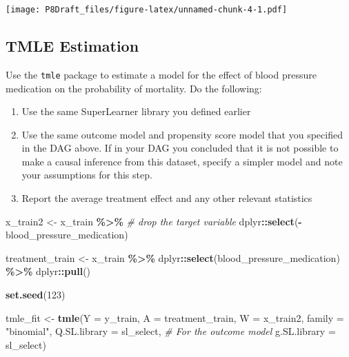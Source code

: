 \documentclass[
]{article}
\newenvironment{Shaded}{\begin{snugshade}}{\end{snugshade}}
\newcommand{\AttributeTok}[1]{\textcolor[rgb]{0.13,0.29,0.53}{#1}}
\newcommand{\CommentTok}[1]{\textcolor[rgb]{0.56,0.35,0.01}{\textit{#1}}}
\newcommand{\DecValTok}[1]{\textcolor[rgb]{0.00,0.00,0.81}{#1}}
\newcommand{\FunctionTok}[1]{\textcolor[rgb]{0.13,0.29,0.53}{\textbf{#1}}}
\newcommand{\NormalTok}[1]{#1}
\newcommand{\OtherTok}[1]{\textcolor[rgb]{0.56,0.35,0.01}{#1}}
\newcommand{\SpecialCharTok}[1]{\textcolor[rgb]{0.81,0.36,0.00}{\textbf{#1}}}
\newcommand{\StringTok}[1]{\textcolor[rgb]{0.31,0.60,0.02}{#1}}
\begin{document}
\texttt{[image: P8Draft\_files/figure-latex/unnamed-chunk-4-1.pdf]}

\hypertarget{tmle-estimation}{%
\subsection{TMLE Estimation}\label{tmle-estimation}}

Use the \texttt{tmle} package to estimate a model for the effect of
blood pressure medication on the probability of mortality. Do the
following:

\begin{enumerate}
    \item Use the same SuperLearner library you defined earlier
    \item Use the same outcome model and propensity score model that you specified in the DAG above. If in your DAG you concluded that it is not possible to make a causal inference from this dataset, specify a simpler model and note your assumptions for this step.
    \item Report the average treatment effect and any other relevant statistics
\end{enumerate}

\begin{Shaded}
\begin{Highlighting}[]
\NormalTok{x\_train2 }\OtherTok{\textless{}{-}}
\NormalTok{  x\_train }\SpecialCharTok{\%\textgreater{}\%}
  \CommentTok{\# drop the target variable}
\NormalTok{  dplyr}\SpecialCharTok{::}\FunctionTok{select}\NormalTok{(}\SpecialCharTok{{-}}\NormalTok{blood\_pressure\_medication) }

\NormalTok{treatment\_train }\OtherTok{\textless{}{-}}\NormalTok{ x\_train }\SpecialCharTok{\%\textgreater{}\%}
\NormalTok{  dplyr}\SpecialCharTok{::}\FunctionTok{select}\NormalTok{(blood\_pressure\_medication) }\SpecialCharTok{\%\textgreater{}\%}
\NormalTok{  dplyr}\SpecialCharTok{::}\FunctionTok{pull}\NormalTok{()}

\FunctionTok{set.seed}\NormalTok{(}\DecValTok{123}\NormalTok{)}


\NormalTok{tmle\_fit }\OtherTok{\textless{}{-}} \FunctionTok{tmle}\NormalTok{(}\AttributeTok{Y =}\NormalTok{ y\_train, }
                 \AttributeTok{A =}\NormalTok{ treatment\_train, }
                 \AttributeTok{W =}\NormalTok{ x\_train2, }
                 \AttributeTok{family =} \StringTok{"binomial"}\NormalTok{,}
                 \AttributeTok{Q.SL.library =}\NormalTok{ sl\_select,  }\CommentTok{\# For the outcome model}
                 \AttributeTok{g.SL.library =}\NormalTok{ sl\_select)}
\end{Highlighting}
\end{Shaded}
\end{document}
